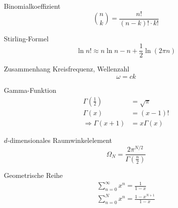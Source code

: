 \documentclass{article}
\newcommand{\lr}[1]{\left(#1\right)}
\begin{document}
Binomialkoeffizient
	\begin{equation}
		\binom{n}{k} = \frac{n!}{(n-k)! \cdot k!}
	\end{equation}

Stirling-Formel
	\begin{equation}
		\ln n! \approx n \ln n - n + \frac{1}{2}\ln ( 2\pi n) 
	\end{equation}

Zusammenhang Kreisfrequenz, Wellenzahl
	\begin{equation}
		\omega = c k
	\end{equation}

Gamma-Funktion
	\begin{align*}
		\Gamma\lr{\frac{1}{2}} &= \sqrt{\pi} \\
		\Gamma(x) &= (x-1)! \\
		\Rightarrow \Gamma(x+1) &= x\Gamma(x)
	\end{align*}

$d$-dimensionales Raumwinkelelement
	\begin{equation}
		\Omega_N = \frac{2\pi^{N/2}}{\Gamma\lr{\frac{n}{2}}}
	\end{equation}

Geometrische Reihe
	\begin{align}
		\sum_{n=0}^\infty x^n = \frac{1}{1 - x} \\
		\sum_{n=0}^N x^n = \frac{1 - x^{N+1}}{1 - x}
	\end{align}
	

\newpage
\end{document}

